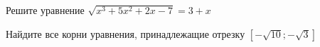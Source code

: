 \begin{ex}
	\begin{condition}
		\begin{enumcols}[label=\asbuk*)]
			\item Решите уравнение \( \sqrt{x^3 + 5x^2 + 2x -7}=3+x \)
			\item Найдите все корни уравнения, принадлежащие отрезку \( \left[-\sqrt{10};-\sqrt{3}\right] \)
		\end{enumcols}
	\end{condition}
\end{ex}